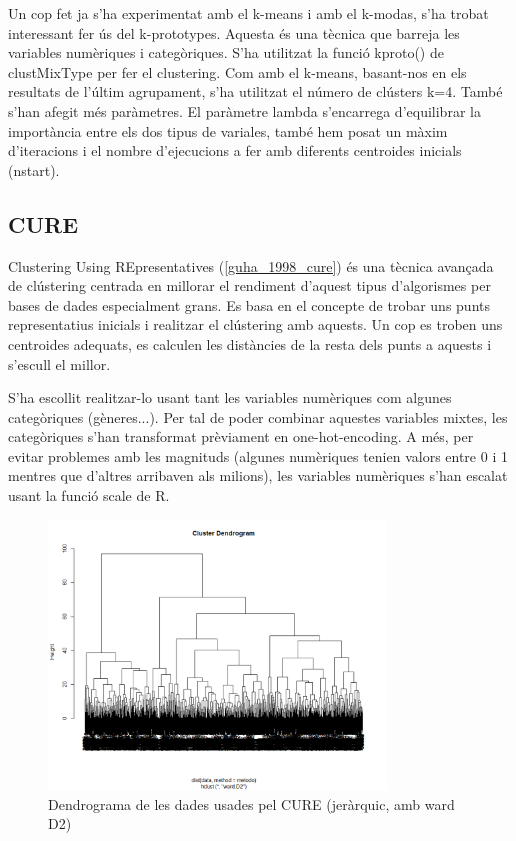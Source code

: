 Un cop fet ja s'ha experimentat amb el k-means i amb el k-modas, s'ha trobat interessant  fer ús del k-prototypes. Aquesta és una tècnica que barreja les variables numèriques i categòriques. S'ha utilitzat la funció kproto() de clustMixType per fer el clustering. Com amb el k-means, basant-nos en els resultats de l'últim agrupament, s'ha utilitzat el número de clústers k=4. També s'han afegit més paràmetres. El paràmetre lambda s'encarrega d'equilibrar la importància entre els dos tipus de variales, també hem posat un màxim d'iteracions i el nombre d'ejecucions a fer amb diferents centroides inicials (nstart). 

\subsection{CURE}
Clustering Using REpresentatives (\ref{guha_1998_cure}) és una tècnica avançada de clústering centrada en millorar el rendiment d’aquest tipus d’algorismes per bases de dades especialment grans. Es basa en el concepte de trobar uns punts representatius inicials i realitzar el clústering amb aquests. Un cop es troben uns centroides adequats, es calculen les distàncies de la resta dels punts a aquests i s’escull el millor.

S’ha escollit realitzar-lo usant tant les variables numèriques com algunes categòriques (gèneres...). Per tal de poder combinar aquestes variables mixtes, les categòriques s’han transformat prèviament en one-hot-encoding. A més, per evitar problemes amb les magnituds (algunes numèriques tenien valors entre 0 i 1 mentres que d’altres arribaven als milions), les variables numèriques s’han escalat usant la funció scale de R.

\begin{figure}[H]
    \centering
    \includegraphics[width=0.8\textwidth]{Images/4_clustering/CURE/curedendrogram.png}
    \caption{Dendrograma de les dades usades pel CURE (jeràrquic, amb ward D2)}
    \label{fig:CURE_dend}
\end{figure}


